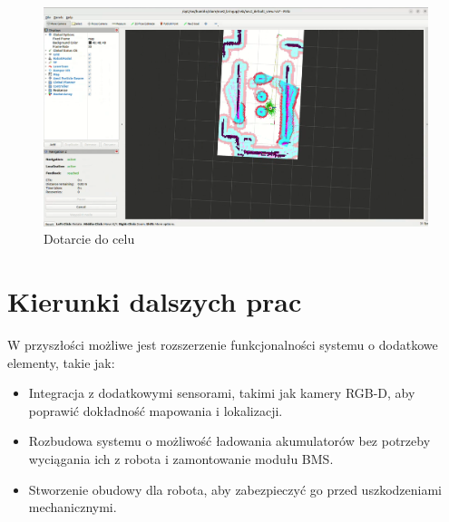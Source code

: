 \documentclass[a4paper,twoside,12pt]{book}
\begin{document}
\begin{figure}[!hb]
	\centering
	\includegraphics[width=1\textwidth]{images/launch-nav6.png}
	\caption{Dotarcie do celu}
	\label{fig:nav-map345}
\end{figure}
\newpage
\section{Kierunki dalszych prac}
W przyszłości możliwe jest rozszerzenie funkcjonalności systemu o dodatkowe elementy, takie jak:
\begin{itemize}
	\item Integracja z dodatkowymi sensorami, takimi jak kamery RGB-D, aby poprawić dokładność mapowania i lokalizacji.
	\item Rozbudowa systemu o możliwość ładowania akumulatorów bez potrzeby wyciągania ich z robota i zamontowanie modułu BMS.
	\item Stworzenie obudowy dla robota, aby zabezpieczyć go przed uszkodzeniami mechanicznymi.
\end{itemize}



\backmatter
\end{document}
